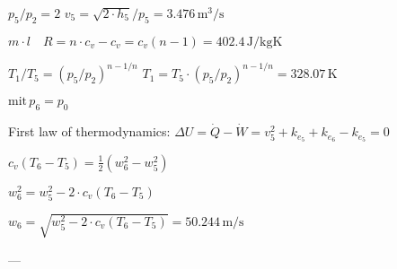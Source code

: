 \( p_5 / p_2 = 2 \)  
\( v_5 = \sqrt{2 \cdot h_5} / p_5 = 3.476 \, \text{m}^3/\text{s} \)  

\( m \cdot l \quad R = n \cdot c_v - c_v = c_v (n - 1) = 402.4 \, \text{J/kgK} \)  

\( T_1 / T_5 = (p_5 / p_2)^{n-1/n} \)  
\( T_1 = T_5 \cdot (p_5 / p_2)^{n-1/n} = 328.07 \, \text{K} \)  

\( \text{mit} \, p_6 = p_0 \)  

First law of thermodynamics:  
\( \Delta U = \dot{Q} - \dot{W} = v_5^2 + k_e_5 + k_e_6 - k_e_5 = 0 \)  

\( c_v (T_6 - T_5) = \frac{1}{2} (w_6^2 - w_5^2) \)  

\( w_6^2 = w_5^2 - 2 \cdot c_v (T_6 - T_5) \)  

\( w_6 = \sqrt{w_5^2 - 2 \cdot c_v (T_6 - T_5)} = 50.244 \, \text{m/s} \)  

---